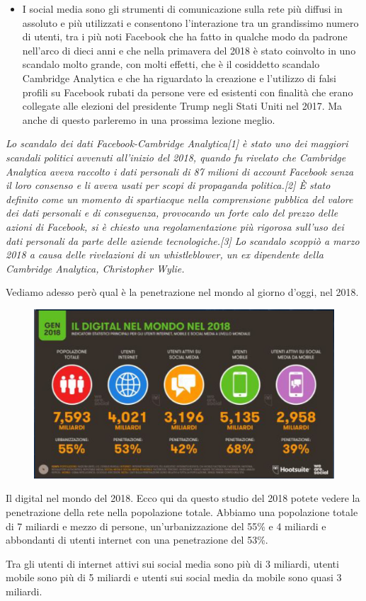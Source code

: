 \begin{itemize}
    \item I social media sono gli strumenti di comunicazione sulla rete più diffusi in assoluto e più utilizzati e consentono l'interazione tra un grandissimo numero di utenti, tra i più noti Facebook che ha fatto in qualche modo da padrone nell'arco di dieci anni e che nella primavera del 2018 è stato coinvolto in uno scandalo molto grande, con molti effetti, che è il cosiddetto scandalo Cambridge Analytica e che ha riguardato la creazione e l'utilizzo di falsi profili su Facebook rubati da persone vere ed esistenti con finalità che erano collegate alle elezioni del presidente Trump negli Stati Uniti nel 2017. Ma anche di questo parleremo in una prossima lezione meglio.
\end{itemize}

\textit{Lo scandalo dei dati Facebook-Cambridge Analytica[1] è stato uno dei maggiori scandali politici avvenuti all'inizio del 2018, quando fu rivelato che Cambridge Analytica aveva raccolto i dati personali di 87 milioni di account Facebook senza il loro consenso e li aveva usati per scopi di propaganda politica.[2] È stato definito come un momento di spartiacque nella comprensione pubblica del valore dei dati personali e di conseguenza, provocando un forte calo del prezzo delle azioni di Facebook, si è chiesto una regolamentazione più rigorosa sull'uso dei dati personali da parte delle aziende tecnologiche.[3]
    Lo scandalo scoppiò a marzo 2018 a causa delle rivelazioni di un whistleblower, un ex dipendente della Cambridge Analytica, Christopher Wylie.}



Vediamo adesso però qual è la penetrazione nel mondo al giorno d'oggi, nel 2018.

\begin{figure}[ht]
    \centering
    \includegraphics[width=0.75\linewidth]{images/06_lez_fig_02.jpg}
\end{figure}

Il digital nel mondo del 2018. Ecco qui da questo studio del 2018 potete vedere la penetrazione della rete nella popolazione totale. Abbiamo una popolazione totale di 7 miliardi e mezzo di persone, un'urbanizzazione del 55\% e 4 miliardi e abbondanti di utenti internet con una penetrazione del 53\%. \par
Tra gli utenti di internet attivi sui social media sono più di 3 miliardi, utenti mobile sono più di 5 miliardi e utenti sui social media da mobile sono quasi 3 miliardi. \par

